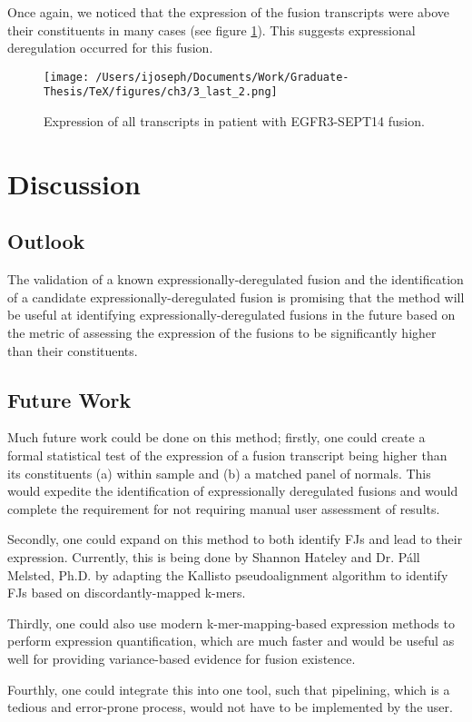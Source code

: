 Once again, we noticed that the expression of the fusion transcripts were above their constituents in many cases (see figure \ref{threefive}). This suggests expressional
deregulation occurred for this fusion.


\begin{figure}
  \centering \texttt{[image: /Users/ijoseph/Documents/Work/Graduate-Thesis/TeX/figures/ch3/3\_last\_2.png]}
  \caption{Expression of all transcripts in patient with EGFR3-SEPT14
    fusion.} \label{threefive}
\end{figure}

\section{Discussion}

\subsection{Outlook}
The validation of a known expressionally-deregulated fusion and the identification of a candidate expressionally-deregulated fusion is promising that the method will be useful at identifying expressionally-deregulated fusions in the future based on the metric of assessing the expression of the fusions to be significantly higher than their constituents.

\subsection{Future Work}
  
Much future work could be done on this method; firstly, one could create a formal statistical test of the expression of a fusion transcript being higher than its constituents (a) within sample and (b) a matched panel of normals. This would expedite the identification of expressionally deregulated fusions and would complete the requirement for not requiring manual user assessment of results.

Secondly, one could expand on this method to both identify FJs and lead to their expression. Currently, this is being done by Shannon Hateley and Dr. P\'{a}ll Melsted, Ph.D. by adapting the Kallisto pseudoalignment algorithm\cite{bray_near-optimal_2016} to identify FJs based on discordantly-mapped k-mers.

Thirdly, one could also use modern k-mer-mapping-based expression methods to perform expression quantification, which are much faster and would be useful as well for providing variance-based evidence for fusion existence.

Fourthly, one could integrate this into one tool, such that pipelining, which is a tedious and error-prone process, would not have to be implemented by the user.









